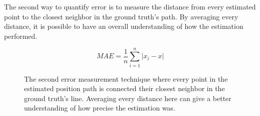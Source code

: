 The second way to quantify error is to measure the distance from every estimated point to the closest neighbor in the ground truth's path. By averaging every distance, it is possible to have an overall understanding of how the estimation performed.

\begin{figure}[!h]
  \centering
  \begin{subfigure}{0.75\textwidth}
    \centering
    \resizebox{1\linewidth}{!}{}
    \label{fig:square3D_error}
  \end{subfigure}


  \begin{subfigure}{0.75\textwidth}
    \centering
    \resizebox{1\linewidth}{!}{}
    \label{fig:square3D_point}
  \end{subfigure}
  \label{fig:error_methods_3D}
\end{figure}


\begin{equation}
  MAE = \frac{1}{n}\sum_{i = 1}^{n} \left\lvert x_i - x\right\rvert
\end{equation}

\begin{figure}
  \centering
  \resizebox{0.8\linewidth}{!}{}
  \caption{ The second error measurement technique where every point in the estimated position path is connected their closest neighbor in the ground truth's line. Averaging every distance here can give a better understanding of how precise the estimation was.}
  \label{fig:comparison}
\end{figure}
